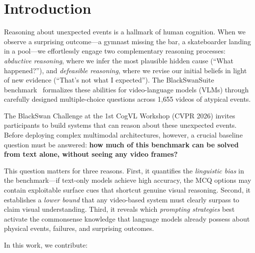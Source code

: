 \section{Introduction}
\label{sec:intro}

Reasoning about unexpected events is a hallmark of human cognition.
When we observe a surprising outcome---a gymnast missing the bar, a skateboarder landing in a pool---we effortlessly engage two complementary reasoning processes: \emph{abductive reasoning}, where we infer the most plausible hidden cause (``What happened?''), and \emph{defeasible reasoning}, where we revise our initial beliefs in light of new evidence (``That's not what I expected'').
The BlackSwanSuite benchmark~\cite{chinchure2025black} formalizes these abilities for video-language models (VLMs) through carefully designed multiple-choice questions across 1{,}655 videos of atypical events.

The BlackSwan Challenge at the 1st CogVL Workshop (CVPR 2026) invites participants to build systems that can reason about these unexpected events.
Before deploying complex multimodal architectures, however, a crucial baseline question must be answered: \textbf{how much of this benchmark can be solved from text alone, without seeing any video frames?}

This question matters for three reasons.
First, it quantifies the \emph{linguistic bias} in the benchmark---if text-only models achieve high accuracy, the MCQ options may contain exploitable surface cues that shortcut genuine visual reasoning.
Second, it establishes a \emph{lower bound} that any video-based system must clearly surpass to claim visual understanding.
Third, it reveals which \emph{prompting strategies} best activate the commonsense knowledge that language models already possess about physical events, failures, and surprising outcomes.

In this work, we contribute:

